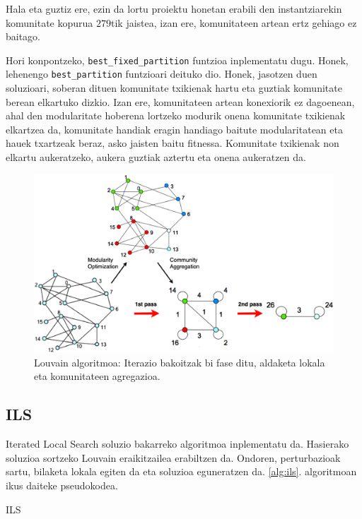 \documentclass[sigconf]{acmart}
\begin{document}
Hala eta guztiz ere, ezin da lortu proiektu honetan erabili den instantziarekin komunitate kopurua $279$tik jaistea, izan ere, komunitateen artean ertz gehiago ez baitago.

Hori konpontzeko, \texttt{best\_fixed\_partition} funtzioa inplementatu dugu. Honek, lehenengo \texttt{best\_partition} funtzioari deituko dio. Honek, jasotzen duen soluzioari, soberan dituen komunitate txikienak hartu eta guztiak komunitate berean elkartuko dizkio. Izan ere, komunitateen artean konexiorik ez dagoenean, ahal den modularitate hoberena lortzeko modurik onena komunitate txikienak elkartzea da, komunitate handiak eragin handiago baitute modularitatean eta hauek txartzeak beraz, asko jaisten baitu fitnessa. Komunitate txikienak non elkartu aukeratzeko, aukera guztiak aztertu eta onena aukeratzen da.

\begin{figure}
    \centering
    \includegraphics[width=\linewidth]{Louvain}
    \caption{Louvain algoritmoa: Iterazio bakoitzak bi fase ditu, aldaketa lokala eta komunitateen agregazioa.}
    \label{fig:louvain}
\end{figure}

\subsection{ILS}
Iterated Local Search \cite{liu2020iterated} soluzio bakarreko algoritmoa inplementatu da. Hasierako soluzioa sortzeko Louvain eraikitzailea erabiltzen da. Ondoren, perturbazioak sartu, bilaketa lokala egiten da eta soluzioa eguneratzen da. \ref{alg:ils}. algoritmoan ikus daiteke pseudokodea.

\begin{algorithm}
    \caption{ILS}
    \label{alg:ils}
\end{algorithm}
\end{document}
